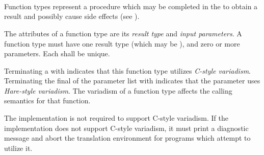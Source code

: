 
\begin{grammar}
 \\
	  \\

 \\
	 \\
	\terminal{(}  \optional{\terminal{,}} \terminal{)}  \\

 \\
	 \\
	 \terminal{,}  \\
	 \terminal{,}  \\

 \\
	 \terminal{:}  \\
	 \\
	  \\
\end{grammar}

\specsubsubitem
Function types represent a procedure which may be completed in the
 to obtain a result and possibly cause side
effects (see ).

\specsubsubitem
The attributes of a function type are its \textit{result type} and
\textit{input parameters}. A function type must have one result type (which may
be ), and zero or more parameters. Each  shall
be unique.

\specsubsubitem
Terminating a  with  indicates that
this function type utilizes \textit{C-style variadism}. Terminating the final
 of the parameter list with  indicates
that the parameter uses \textit{Hare-style variadism}. The variadism of a
function type affects the calling semantics for that function.

\specsubsubitem
The implementation is not required to support C-style variadism. If the
implementation does not support C-style variadism, it must print a diagnostic
message and abort the translation environment for programs which attempt to
utilize it.

